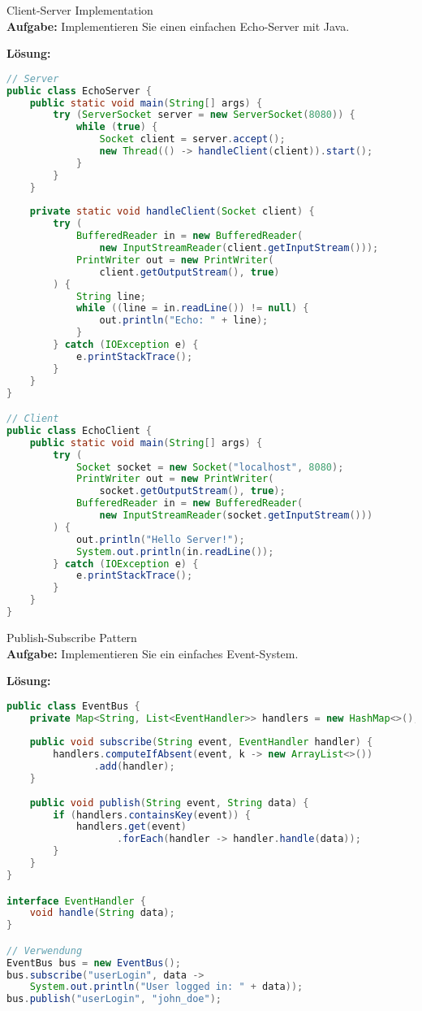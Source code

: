 \begin{example}{Client-Server Implementation}\\
\textbf{Aufgabe:} Implementieren Sie einen einfachen Echo-Server mit Java.

\textbf{Lösung:}
\begin{lstlisting}[language=Java, style=base]
// Server
public class EchoServer {
    public static void main(String[] args) {
        try (ServerSocket server = new ServerSocket(8080)) {
            while (true) {
                Socket client = server.accept();
                new Thread(() -> handleClient(client)).start();
            }
        }
    }
    
    private static void handleClient(Socket client) {
        try (
            BufferedReader in = new BufferedReader(
                new InputStreamReader(client.getInputStream()));
            PrintWriter out = new PrintWriter(
                client.getOutputStream(), true)
        ) {
            String line;
            while ((line = in.readLine()) != null) {
                out.println("Echo: " + line);
            }
        } catch (IOException e) {
            e.printStackTrace();
        }
    }
}

// Client
public class EchoClient {
    public static void main(String[] args) {
        try (
            Socket socket = new Socket("localhost", 8080);
            PrintWriter out = new PrintWriter(
                socket.getOutputStream(), true);
            BufferedReader in = new BufferedReader(
                new InputStreamReader(socket.getInputStream()))
        ) {
            out.println("Hello Server!");
            System.out.println(in.readLine());
        } catch (IOException e) {
            e.printStackTrace();
        }
    }
}
\end{lstlisting}
\end{example}

\begin{example}{Publish-Subscribe Pattern}\\
\textbf{Aufgabe:} Implementieren Sie ein einfaches Event-System.

\textbf{Lösung:}
\begin{lstlisting}[language=Java, style=base]
public class EventBus {
    private Map<String, List<EventHandler>> handlers = new HashMap<>();
    
    public void subscribe(String event, EventHandler handler) {
        handlers.computeIfAbsent(event, k -> new ArrayList<>())
               .add(handler);
    }
    
    public void publish(String event, String data) {
        if (handlers.containsKey(event)) {
            handlers.get(event)
                   .forEach(handler -> handler.handle(data));
        }
    }
}

interface EventHandler {
    void handle(String data);
}

// Verwendung
EventBus bus = new EventBus();
bus.subscribe("userLogin", data -> 
    System.out.println("User logged in: " + data));
bus.publish("userLogin", "john_doe");
\end{lstlisting}
\end{example}

